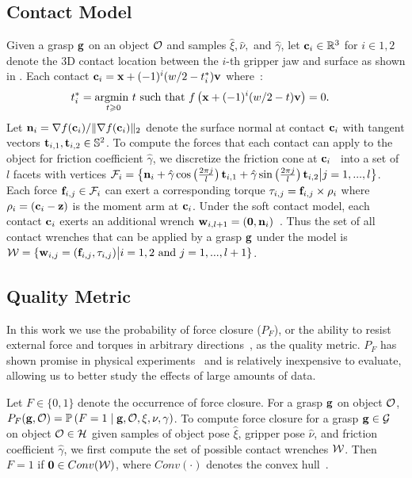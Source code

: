 \subsection{Contact Model}
Given a grasp $\mathbf{g}$ on an object $\mathcal{O}$ and samples $\hat{\xi}, \hat{\nu},$ and $\hat{\gamma}$, let $\mathbf{c}_i \in \mathbb{R}^3$ for $i \in {1, 2}$ denote the 3D contact location between the $i$-th gripper jaw and surface as shown in .
Each contact $\mathbf{c}_i = \mathbf{x} + (-1)^{i} (w / 2 - t_i^*) \mathbf{v}$ where~\cite{mahler2015gp}:
\begin{align*}
	t_i^* &= \underset{t \geqslant 0}{\text{argmin }} t \text{ such that } f\left(\mathbf{x} +  (-1)^{i} (w / 2 - t) \mathbf{v}\right) = 0.
\end{align*}
\noindent Let $\mathbf{n}_i = \nabla f(\mathbf{c}_i) / \| \nabla f(\mathbf{c}_i) \|_2$ denote the surface normal at contact $\mathbf{c}_i$ with tangent vectors $\mathbf{t}_{i,1}, \mathbf{t}_{i,2} \in \mathbb{S}^2$.
To compute the forces that each contact can apply to the object for friction coefficient $\hat{\gamma}$, we discretize the friction cone at $\mathbf{c}_i$~\cite{pokorny2013c} into a set of $l$ facets with vertices $\mathcal{F}_{i} = \left\{ \mathbf{n}_i + \hat{\gamma} \cos \left( \frac{2 \pi j}{l} \right) \mathbf{t}_{i,1} + \hat{\gamma} \sin \left( \frac{2 \pi j}{l} \right) \mathbf{t}_{i,2} \big| j = 1, ..., l \right\}$.
Each force $\mathbf{f}_{i,j} \in \mathcal{F}_{i}$ can exert a corresponding torque $\tau_{i,j} = \mathbf{f}_{i,j} \times \rho_i$ where $\rho_i = (\mathbf{c}_i - \mathbf{z})$ is the moment arm at $\mathbf{c}_i$.
Under the soft contact model, each contact $\mathbf{c}_i$ exerts an additional wrench $\mathbf{w}_{i,l+1} = (\mathbf{0}, \mathbf{n}_i)$~\cite{zheng2005}.
Thus the set of all contact wrenches that can be applied by a grasp $\mathbf{g}$ under the model is $\mathcal{W} = \{ \mathbf{w}_{i,j} = (\mathbf{f}_{i,j}, \tau_{i,j}) \big| i = 1, 2 \text{ and } j = 1, ..., l+1\}$.

\subsection{Quality Metric}
In this work we use the probability of force closure ($P_F$), or the ability to resist external force and torques in arbitrary directions~\cite{mahler2015gp}, as the quality metric.
$P_F$ has shown promise in physical experiments~\cite{kim2012physically, weisz2012pose} and is relatively inexpensive to evaluate, allowing us to better study the effects of large amounts of data.

Let $F \in \{0, 1\}$ denote the occurrence of force closure.
For a grasp $\mathbf{g}$ on object $\mathcal{O}$, $P_F(\mathbf{g}, \mathcal{O}) = \mathbb{P}\left(F = 1 \mid \mathbf{g}, \mathcal{O}, \xi, \nu, \gamma \right)$.
To compute force closure for a grasp $\mathbf{g} \in \mathcal{G}$ on object $\mathcal{O} \in \mathcal{H}$ given samples of object pose $\hat{\xi}$, gripper pose $\hat{\nu}$, and friction coefficient $\hat{\gamma}$, we first compute the set of possible contact wrenches $\mathcal{W}$.
Then $F = 1$ if $\mathbf{0} \in Conv(\mathcal{W})$, where $Conv(\cdot)$ denotes the convex hull~\cite{weisz2012pose}.

